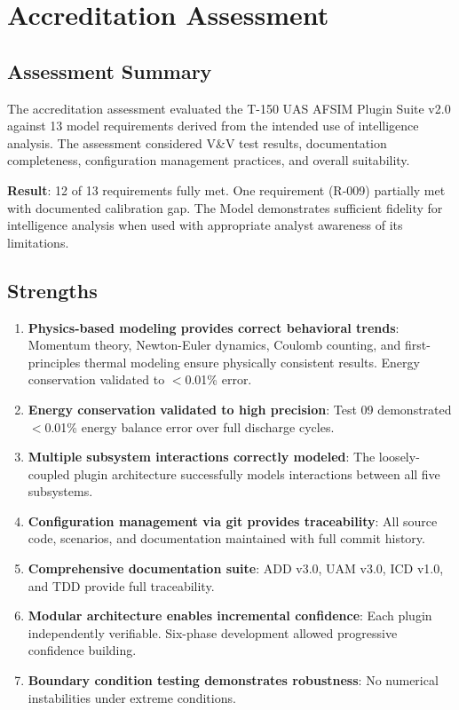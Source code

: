 \documentclass[11pt, letterpaper]{article}
\begin{document}
\pagebreak


\section{\unclass Accreditation Assessment}

\subsection{\unclass Assessment Summary}

\unclass The accreditation assessment evaluated the T-150 UAS AFSIM Plugin Suite v2.0 against 13 model requirements derived from the intended use of intelligence analysis. The assessment considered V\&V test results, documentation completeness, configuration management practices, and overall suitability.

\unclass \textbf{Result}: 12 of 13 requirements fully met. One requirement (R-009) partially met with documented calibration gap. The Model demonstrates sufficient fidelity for intelligence analysis when used with appropriate analyst awareness of its limitations.

\subsection{\unclass Strengths}

\begin{enumerate}
    \item \unclass \textbf{Physics-based modeling provides correct behavioral trends}: Momentum theory, Newton-Euler dynamics, Coulomb counting, and first-principles thermal modeling ensure physically consistent results. Energy conservation validated to $<$0.01\% error.
    \item \unclass \textbf{Energy conservation validated to high precision}: Test 09 demonstrated $<$0.01\% energy balance error over full discharge cycles.
    \item \unclass \textbf{Multiple subsystem interactions correctly modeled}: The loosely-coupled plugin architecture successfully models interactions between all five subsystems.
    \item \unclass \textbf{Configuration management via git provides traceability}: All source code, scenarios, and documentation maintained with full commit history.
    \item \unclass \textbf{Comprehensive documentation suite}: ADD v3.0, UAM v3.0, ICD v1.0, and TDD provide full traceability.
    \item \unclass \textbf{Modular architecture enables incremental confidence}: Each plugin independently verifiable. Six-phase development allowed progressive confidence building.
    \item \unclass \textbf{Boundary condition testing demonstrates robustness}: No numerical instabilities under extreme conditions.
\end{enumerate}
\end{document}
